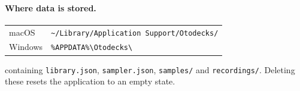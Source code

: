 \documentclass[11pt,a4paper]{article}
\newcommand{\code}[1]{\texttt{#1}}
\begin{document}
\paragraph{Where data is stored.}

\begin{table}[H]
\centering
\small
\begin{tabular}{ll}
\toprule
macOS   & \code{\textasciitilde/Library/Application Support/Otodecks/} \\
Windows & \code{\%APPDATA\%\textbackslash Otodecks\textbackslash} \\
\bottomrule
\end{tabular}
\end{table}

\noindent
containing \code{library.json}, \code{sampler.json}, \code{samples/} and
\code{recordings/}. Deleting these resets the application to an empty state.
\end{document}
